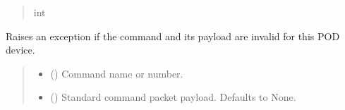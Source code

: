 \documentclass[letterpaper,10pt,english]{sphinxmanual}
\begin{document}
\begin{fulllineitems}
\begin{fulllineitems}
\begin{quote}
\begin{description}
\sphinxAtStartPar
int

\end{description}\end{quote}

\end{fulllineitems}


\begin{fulllineitems}
\label{\detokenize{Morelia.Commands:Morelia.Commands.PodCommands.CommandSet.ValidateCommand}}
\pysigstartsignatures
{}
\pysigstopsignatures
\sphinxAtStartPar
Raises an exception if the command and its payload are invalid for this POD device.
\begin{quote}\begin{description}
\begin{itemize}
\item {} 
\sphinxAtStartPar
{} (\sphinxstyleliteralemphasis{\sphinxupquote{ | }}) \textendash{} Command name or number.

\item {} 
\sphinxAtStartPar
{} (\sphinxstyleliteralemphasis{\sphinxupquote{ | }}\sphinxstyleliteralemphasis{\sphinxupquote{ | }}\sphinxstyleliteralemphasis{\sphinxupquote{{[}}}\sphinxstyleliteralemphasis{\sphinxupquote{ | }}\sphinxstyleliteralemphasis{\sphinxupquote{{]} }}\sphinxstyleliteralemphasis{\sphinxupquote{| }}\sphinxstyleliteralemphasis{\sphinxupquote{, }}) \textendash{} Standard command packet payload. Defaults to None.


\end{itemize}
\end{description}
\end{quote}
\end{fulllineitems}
\end{fulllineitems}
\end{document}
